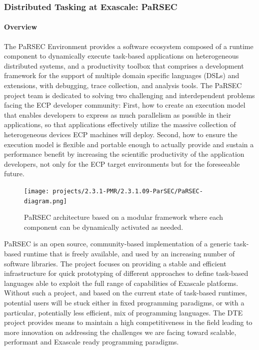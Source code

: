 \subsubsection{ Distributed Tasking at Exascale: PaRSEC}


\paragraph{Overview}

The PaRSEC Environment provides a software ecosystem composed of a runtime
component to dynamically execute task-based applications on heterogeneous
distributed systems, and a productivity toolbox that comprises a development
framework for the support of multiple domain specific languages (DSLs) and
extensions, with debugging, trace collection, and analysis tools.
%
The PaRSEC project team is dedicated to solving two challenging and
interdependent problems facing the ECP developer community: First, how to create
an execution model that enables developers to express as much parallelism as
possible in their applications, so that applications effectively utilize the
massive collection of heterogeneous devices ECP machines will deploy. Second,
how to ensure the execution model is flexible and portable enough to actually
provide and sustain a performance benefit by increasing the scientific
productivity of the application developers, not only for the ECP target
environments but for the foreseeable future.

\begin{figure}
  \texttt{[image: projects/2.3.1-PMR/2.3.1.09-ParSEC/PaRSEC-diagram.png]}
  \caption{PaRSEC architecture\label{fig:parsec} based on a modular framework where each
           component can be dynamically activated as needed.}
\end{figure}
%
PaRSEC is an open source, community-based implementation of a generic task-based
runtime that is freely available, and used by an increasing number of software
libraries.
The project focuses on providing a stable and efficient infrastructure for quick
prototyping of different approaches to define task-based languages able to
exploit the full range of capabilities of Exascale platforms. Without such a
project, and based on the current state of task-based runtimes, potential users
will be stuck either in fixed programming paradigms, or with a particular,
potentially less efficient, mix of programming languages. The DTE project
provides means to maintain a high competitiveness in the field leading to more
innovation on addressing the challenges we are facing toward scalable,
performant and Exascale ready programming paradigms.

